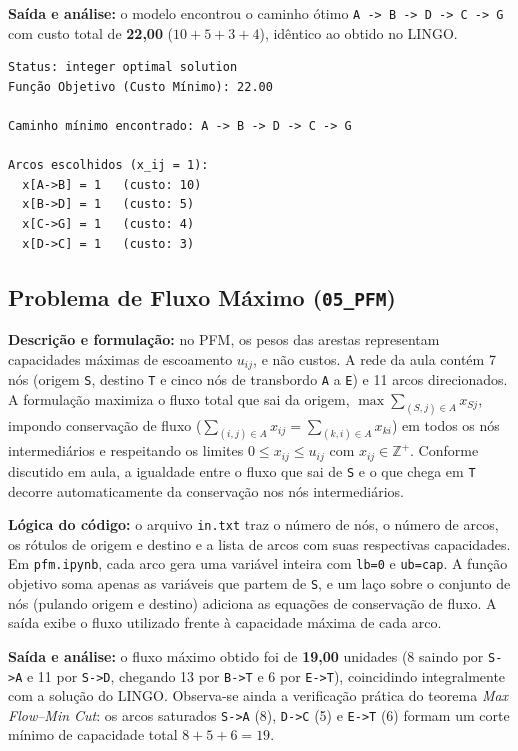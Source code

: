 \documentclass[11pt,a4paper]{article}
\begin{document}
\textbf{Saída e análise:} o modelo encontrou o caminho ótimo \texttt{A -> B -> D -> C -> G} com custo total de \textbf{22,00} ($10 + 5 + 3 + 4$), idêntico ao obtido no LINGO.

\begin{minipage}{\linewidth}
\begin{lstlisting}
Status: integer optimal solution
Função Objetivo (Custo Mínimo): 22.00

Caminho mínimo encontrado: A -> B -> D -> C -> G

Arcos escolhidos (x_ij = 1):
  x[A->B] = 1   (custo: 10)
  x[B->D] = 1   (custo: 5)
  x[C->G] = 1   (custo: 4)
  x[D->C] = 1   (custo: 3)
\end{lstlisting}
\end{minipage}

\subsection{Problema de Fluxo Máximo (\texttt{05\_PFM})}
\textbf{Descrição e formulação:} no PFM, os pesos das arestas representam capacidades máximas de escoamento $u_{ij}$, e não custos. A rede da aula contém 7 nós (origem \texttt{S}, destino \texttt{T} e cinco nós de transbordo \texttt{A} a \texttt{E}) e 11 arcos direcionados. A formulação maximiza o fluxo total que sai da origem, $\max \sum_{(S,j)\in A} x_{Sj}$, impondo conservação de fluxo ($\sum_{(i,j)\in A} x_{ij} = \sum_{(k,i)\in A} x_{ki}$) em todos os nós intermediários e respeitando os limites $0 \le x_{ij} \le u_{ij}$ com $x_{ij} \in \mathbb{Z}^+$. Conforme discutido em aula, a igualdade entre o fluxo que sai de \texttt{S} e o que chega em \texttt{T} decorre automaticamente da conservação nos nós intermediários.

\textbf{Lógica do código:} o arquivo \texttt{in.txt} traz o número de nós, o número de arcos, os rótulos de origem e destino e a lista de arcos com suas respectivas capacidades. Em \texttt{pfm.ipynb}, cada arco gera uma variável inteira com \texttt{lb=0} e \texttt{ub=cap}. A função objetivo soma apenas as variáveis que partem de \texttt{S}, e um laço sobre o conjunto de nós (pulando origem e destino) adiciona as equações de conservação de fluxo. A saída exibe o fluxo utilizado frente à capacidade máxima de cada arco.

\textbf{Saída e análise:} o fluxo máximo obtido foi de \textbf{19,00} unidades (8 saindo por \texttt{S->A} e 11 por \texttt{S->D}, chegando 13 por \texttt{B->T} e 6 por \texttt{E->T}), coincidindo integralmente com a solução do LINGO. Observa-se ainda a verificação prática do teorema \textit{Max Flow--Min Cut}: os arcos saturados \texttt{S->A} (8), \texttt{D->C} (5) e \texttt{E->T} (6) formam um corte mínimo de capacidade total $8 + 5 + 6 = 19$.
\end{document}
